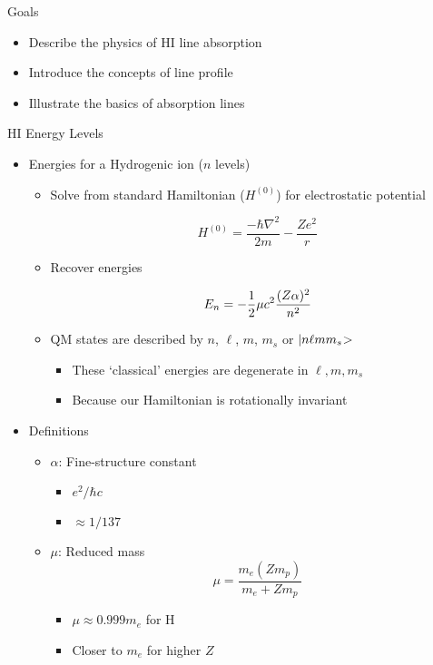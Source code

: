 \documentclass[12pt,letterpaper]{article}
\begin{document}

\begin{Aenumerate}

{\bf \item Goals}
 \begin{itemize}
  \item Describe the physics of HI line absorption
  \item Introduce the concepts of line profile
  \item Illustrate the basics of absorption lines
 \end{itemize}

{\bf \item HI Energy Levels}

 \begin{itemize}
  \item Energies for a Hydrogenic ion ($n$ levels)

  \begin{itemize} 
    \item Solve from standard Hamiltonian ($H^{(0)}$)
    for electrostatic potential

\begin{equation}
H^{(0)} = \frac{-\hbar \nabla^2}{2m} - \frac{Z e^2}{r}
\end{equation}

    \item Recover energies

  \begin{equation}
  E_n = -\frac{1}{2} \mu c^2 \frac{(Z \alpha)^2}{n^2}
  \end{equation}

    \item QM states are described by $n$, $\ell$, $m$, $m_s$
    or ${|n \ell m m_s\negmedspace>}$
	  \begin{itemize}
	  \item These `classical' energies are degenerate in $\ell, m, m_s$
	  \item Because our Hamiltonian is rotationally invariant
	  \end{itemize}
	 \end{itemize}
  \item Definitions
    \begin{itemize}
    \item $\alpha$: Fine-structure constant
	\begin{itemize}
      \item $e^2/\hbar c$
      \item $\approx 1/137$
	\end{itemize}
    \item $\mu$: Reduced mass
    \begin{equation}
    \mu = \frac{m_e (Z m_p)}{m_e + Z m_p}
    \end{equation}
	\begin{itemize}
      \item $\mu \approx 0.999 m_e$ for H
      \item Closer to $m_e$ for higher $Z$
	\end{itemize}


\end{itemize}
\end{itemize}
\end{Aenumerate}
\end{document}
